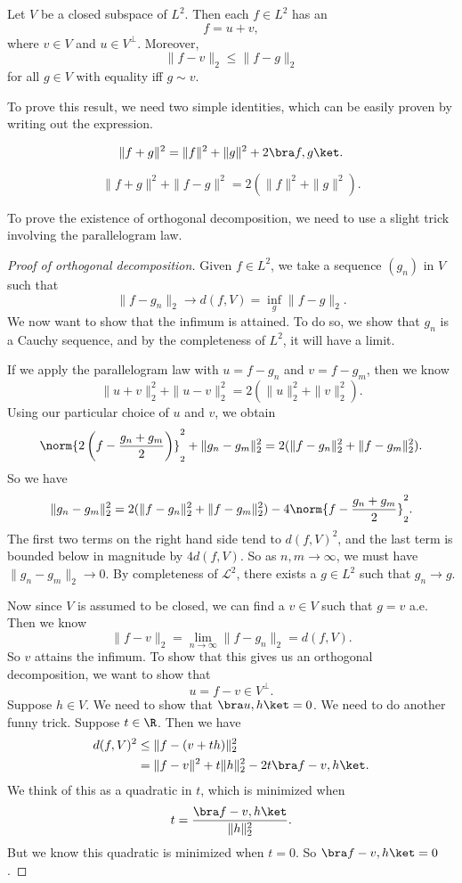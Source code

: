 \documentclass[a4paper]{article}
\begin{document}
\begin{thm}
  Let $V$ be a closed subspace of $L^2$. Then each $f \in L^2$ has an 
  \[
    f = u + v,
  \]
  where $v \in V$ and $u \in V^\perp$. Moreover,
  \[
    \|f - v\|_2 \leq \|f - g\|_2
  \]
  for all $g \in V$ with equality iff $g \sim v$.
\end{thm}

To prove this result, we need two simple identities, which can be easily proven by writing out the expression.
\begin{lemma}
  \[
    \|f + g\|^2 = \|f\|^2 + \|g\|^2 + 2 \bra f, g\ket.
  \]
\end{lemma}

\begin{lemma}
  \[
    \|f + g\|^2 + \|f - g\|^2 = 2(\|f\|^2 + \|g\|^2).
  \]
\end{lemma}

To prove the existence of orthogonal decomposition, we need to use a slight trick involving the parallelogram law.

\begin{proof}[Proof of orthogonal decomposition]
  Given $f \in L^2$, we take a sequence $(g_n)$ in $V$ such that
  \[
    \|f - g_n\|_2 \to d(f, V) = \inf_g \|f - g\|_2.
  \]
  We now want to show that the infimum is attained. To do so, we show that $g_n$ is a Cauchy sequence, and by the completeness of $L^2$, it will have a limit.

  If we apply the parallelogram law with $u = f - g_n$ and $v = f - g_m$, then we know
  \[
    \|u + v\|^2_2 + \|u - v\|_2^2 = 2(\|u\|^2_2 + \|v\|_2^2).
  \]
  Using our particular choice of $u$ and $v$, we obtain
  \[
    \norm{2 \left(f - \frac{g_n + g_m}{2}\right)}_2^2 + \|g_n - g_m\|_2^2 = 2(\|f - g_n\|_2^2 + \|f - g_m\|^2_2).
  \]
  So we have
  \[
    \|g_n - g_m\|_2^2 = 2(\|f - g_n\|_2^2 + \|f - g_m\|^2_2) - 4\norm{f - \frac{g_n + g_m}{2}}_2^2.
  \]
  The first two terms on the right hand side tend to $d(f, V)^2$, and the last term is bounded below in magnitude by $4d(f, V)$. So as $n, m \to \infty$, we must have $\|g_n - g_m\|_2 \to 0$. By completeness of $\mathcal{L}^2$, there exists a $g \in L^2$ such that $g_n \to g$.

  Now since $V$ is assumed to be closed, we can find a $v \in V$ such that $g = v$ a.e. Then we know
  \[
    \|f - v\|_2 = \lim_{n \to \infty}\|f - g_n\|_2 = d(f, V).
  \]
  So $v$ attains the infimum. To show that this gives us an orthogonal decomposition, we want to show that
  \[
    u = f - v \in V^\perp.
  \]
  Suppose $h \in V$. We need to show that $\bra u, h\ket = 0$. We need to do another funny trick. Suppose $t \in \R$. Then we have
  \begin{align*}
    d(f, V)^2 &\leq \|f - (v + th)\|_2^2 \\
    &= \|f - v\|^2 + t \|h\|_2^2 - 2t \bra f - v, h\ket.
  \end{align*}
  We think of this as a quadratic in $t$, which is minimized when
  \[
    t = \frac{\bra f - v, h\ket}{\|h\|^2_2}.
  \]
  But we know this quadratic is minimized when $t = 0$. So $\bra f - v, h\ket = 0$.
\end{proof}
\end{document}
